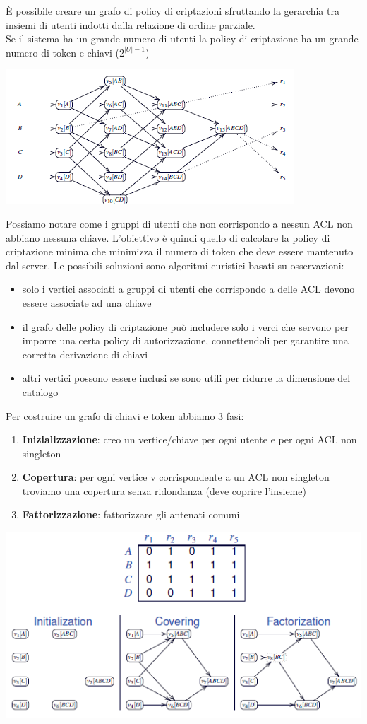 È possibile creare un grafo di policy di criptazioni sfruttando la gerarchia tra insiemi di utenti indotti dalla relazione di ordine parziale. \\
Se il sistema ha un grande numero di utenti la policy di criptazione ha un grande numero di token e chiavi (\(2^{|U|-1}\))
\begin{center}
    \includegraphics[scale=0.7]{img/transpolicy.png}
\end{center}
Possiamo notare come i gruppi di utenti che non corrispondo a nessun ACL non abbiano nessuna chiave. L'obiettivo è quindi quello di calcolare la policy di criptazione minima che minimizza il numero di token che deve essere mantenuto dal server. Le possibili soluzioni sono algoritmi euristici basati su osservazioni:
\begin{itemize}
    \item solo i vertici associati a gruppi di utenti che corrispondo a delle ACL devono essere associate ad una chiave
    \item il grafo delle policy di criptazione può includere solo i verci che servono per imporre una certa policy di autorizzazione, connettendoli per garantire una corretta derivazione di chiavi
    \item altri vertici possono essere inclusi se sono utili per ridurre la dimensione del catalogo
\end{itemize}
Per costruire un grafo di chiavi e token abbiamo 3 fasi:
\begin{enumerate}
    \item \textbf{Inizializzazione}: creo un vertice/chiave per ogni utente e per ogni ACL non singleton
    \item \textbf{Copertura}: per ogni vertice v corrispondente a un ACL non singleton troviamo una copertura senza ridondanza (deve coprire l'insieme)
    \item \textbf{Fattorizzazione}: fattorizzare gli antenati comuni
\end{enumerate}
\begin{center}
    \includegraphics[scale=0.7]{img/keytoken.png}
\end{center}
